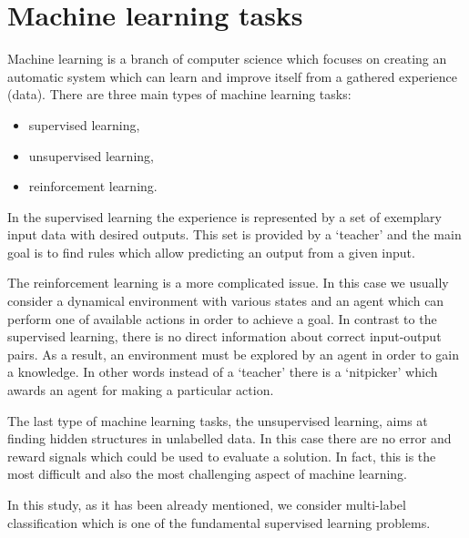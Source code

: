 \section{Machine learning tasks}

Machine learning is a branch of computer science which focuses on creating an automatic system which can learn and improve itself from a gathered experience (data). There are three main types of machine learning tasks:

\begin{itemize}
\item supervised learning,
\item unsupervised learning,
\item reinforcement learning.
\end{itemize}

In the supervised learning the experience is represented by a set of exemplary input data with desired outputs. This set is provided by a `teacher' and the main goal is to find rules which allow predicting an output from a given input.

The reinforcement learning is a more complicated issue. In this case we usually consider a dynamical environment with various states and an agent which can perform one of available actions in order to achieve a goal. In contrast to the supervised learning, there is no direct information about correct input-output pairs. As a result, an environment must be explored by an agent in order to gain a knowledge. In other words instead of a `teacher' there is a `nitpicker' which awards an agent for making a particular action. 

The last type of machine learning tasks, the unsupervised learning, aims at finding hidden structures in unlabelled data. In this case there are no error and reward signals which could be used to evaluate a solution. In fact, this is the most difficult and also the most challenging aspect of machine learning. 

In this study, as it has been already mentioned, we consider multi-label classification which is one of the fundamental supervised learning problems. 

